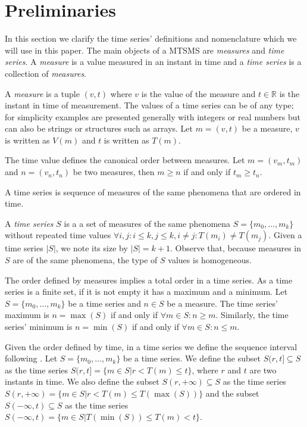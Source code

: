 \section{Preliminaries}
\label{sec:model:preliminaries}

In this section we clarify the time series' definitions and
nomenclature which we will use in this paper.  The main objects of a
MTSMS are \emph{measures} and \emph{time series}. A \emph{measure} is
a value measured in an instant in time and a \emph{time series} is a
collection of \emph{measures}.

A \emph{measure} is a tuple $(v,t)$ where $v$ is the value of the
measure and $t \in \mathbb{R}$ is the instant in time of measurement.
The values of a time series can be of any type; for simplicity
examples are presented generally with integers or real numbers but can
also be strings or structures such as arrays.  Let $m = (v,t)$ be a
measure, $v$ is written as $V(m)$ and $t$ is written as $T(m)$.

The time value defines the canonical order between measures.  Let $m =
(v_m, t_m)$ and $n = (v_n, t_n)$ be two measures, then $m\geq n$ if
and only if $t_m\geq t_n$.

A time series is sequence of measures of the same phenomena that are
ordered in time.
\begin{definition}
  A \emph{time series} $S$ is a a set of measures of the same
  phenomena $S = \{m_0, \ldots, m_k\}$ without repeated time values
  $\forall i,j: i\leq k, j\leq k, i\neq j : T(m_i)\neq T(m_j)$. Given
  a time series $|S|$, we note its size by $|S|=k+1$. Observe that,
  because measures in $S$ are of the same phenomena, the type of $S$
  values is homogeneous.
\end{definition}

The order defined by measures implies a total order in a time
series. As a time series is a finite set, if it is not empty it has a
maximum and a minimum.  Let $S=\{m_0,\ldots,m_k\}$ be a time series
and $n\in S$ be a measure. The time series' maximum is $n=\max(S)$ if
and only if $\forall m \in S: n \geq m $.  Similarly, the time series'
minimum is $n=\min(S)$ if and only if $\forall m \in S: n \leq m$.

Given the order defined by time, in a time series we define the
sequence interval following \cite{last:keogh,last:hetland}.  Let
$S=\{m_0, \ldots, m_k\}$ be a time series. We define the subset
$S(r,t] \subseteq S$ as the time series $S(r,t]=\{m\in S | r<T(m)\leq
t\}$, where $r$ and $t$ are two instants in time.  We also define the
subset $S(r,+\infty)\subseteq S$ as the time series $S(r,+\infty) =
\{m\in S | r< T(m) \leq T(\max(S))\}$ and the subset
$S(-\infty,t)\subseteq S$ as the time series $S(-\infty,t) = \{m\in S
| T(\min(S))\leq T(m) < t\}$.


